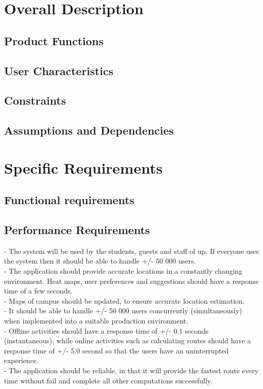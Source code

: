 \documentclass[12pt]{article}
\begin{document}
	\section{Overall Description}	
	\subsection{Product Functions}
	\subsection{User Characteristics}
	\subsection{Constraints}
	\subsection{Assumptions and Dependencies}
	\section{Specific Requirements}
	\subsection{Functional requirements}
	\subsection{Performance Requirements}
	- The system will be used by the students, guests and staff of up. If everyone uses the system then it should be able to handle +/- 50 000 users. \\
	- The application should provide accurate locations in a constantly changing environment. Heat maps, user preferences and suggestions should have a response time of a few seconds.\\
	- Maps of campus should be updated, to ensure accurate location estimation. \\
	- It should be able to handle +/- 50 000 users concurrently (simultaneously) when implemented into a suitable production environment. \\
	- Offline activities should have a response time of +/- 0.1 seconds (instantaneous), while online activities such as calculating routes should have a response time of +/- 5.0 second so that the users have an uninterrupted experience. \\
	- The application should be reliable, in that it will provide the fastest route every time without fail and complete all other computations successfully. 
\end{document}
